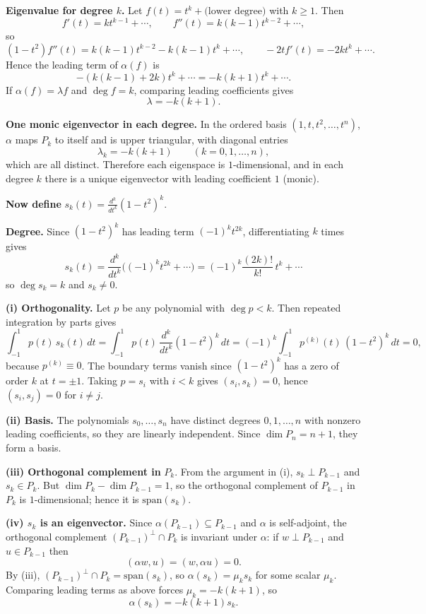 \documentclass[12pt,a4paper]{article}
\theoremstyle{plain}
\theoremstyle{definition}      %
\begin{document}
\textbf{Eigenvalue for degree $k$.}
Let $f(t)=t^k+\text{(lower degree)}$ with $k\ge 1$. Then
\[
f'(t)=k t^{k-1}+\cdots,\qquad f''(t)=k(k-1)t^{k-2}+\cdots,
\]
so
\[
(1-t^2)f''(t)=k(k-1)t^{k-2}-k(k-1)t^k+\cdots,\qquad -2t f'(t)=-2k t^k+\cdots.
\]
Hence the leading term of $\alpha(f)$ is
\[
-(k(k-1)+2k)t^k+\cdots=-k(k+1)t^k+\cdots.
\]
If $\alpha(f)=\lambda f$ and $\deg f=k$, comparing leading coefficients gives
\[
\lambda=-k(k+1).
\]

\textbf{One monic eigenvector in each degree.}
In the ordered basis $(1,t,t^2,\dots,t^n)$, $\alpha$ maps $P_k$ to itself and is upper triangular, with diagonal entries
\[
\lambda_k=-k(k+1)\qquad (k=0,1,\dots,n),
\]
which are all distinct. Therefore each eigenspace is $1$-dimensional, and in each degree $k$ there is a unique eigenvector with leading coefficient $1$ (monic).

\textbf{Now define } $s_k(t)=\frac{d^k}{dt^k}(1-t^2)^k$.

\textbf{Degree.} Since $(1-t^2)^k$ has leading term $(-1)^k t^{2k}$, differentiating $k$ times gives
\[
s_k(t) = \frac{d^k}{dt^k}\bigl((-1)^k t^{2k} + \cdots\bigr)
= (-1)^k \frac{(2k)!}{k!}\, t^k + \cdots
\]
so $\deg s_k=k$ and $s_k\neq 0$.

\textbf{(i) Orthogonality.}
Let $p$ be any polynomial with $\deg p<k$. Then repeated integration by parts gives
\[
\int_{-1}^{1} p(t)\,s_k(t)\,dt
=\int_{-1}^{1} p(t)\,\frac{d^k}{dt^k}(1-t^2)^k\,dt
=(-1)^k\int_{-1}^{1} p^{(k)}(t)\,(1-t^2)^k\,dt=0,
\]
because $p^{(k)}\equiv 0$. The boundary terms vanish since $(1-t^2)^k$ has a zero of order $k$ at $t=\pm 1$.
Taking $p=s_i$ with $i<k$ gives $(s_i,s_k)=0$, hence $(s_i,s_j)=0$ for $i\ne j$.

\textbf{(ii) Basis.}
The polynomials $s_0,\dots,s_n$ have distinct degrees $0,1,\dots,n$ with nonzero leading coefficients, so they are linearly independent.
Since $\dim P_n=n+1$, they form a basis.

\textbf{(iii) Orthogonal complement in } $P_k$.
From the argument in (i), $s_k\perp P_{k-1}$ and $s_k\in P_k$.
But $\dim P_k-\dim P_{k-1}=1$, so the orthogonal complement of $P_{k-1}$ in $P_k$ is $1$-dimensional; hence it is $\mathrm{span}(s_k)$.

\textbf{(iv) $s_k$ is an eigenvector.}
Since $\alpha(P_{k-1})\subseteq P_{k-1}$ and $\alpha$ is self-adjoint, the orthogonal complement $(P_{k-1})^\perp\cap P_k$ is invariant under $\alpha$:
if $w\perp P_{k-1}$ and $u\in P_{k-1}$ then
\[
(\alpha w,u)=(w,\alpha u)=0.
\]
By (iii), $(P_{k-1})^\perp\cap P_k=\mathrm{span}(s_k)$, so $\alpha(s_k)=\mu_k s_k$ for some scalar $\mu_k$.
Comparing leading terms as above forces $\mu_k=-k(k+1)$, so
\[
\alpha(s_k)=-k(k+1)s_k.
\]
\end{document}
